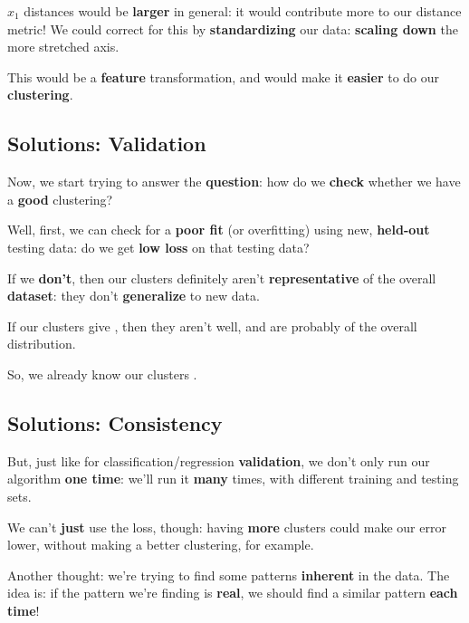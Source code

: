         $x_1$ distances would be \textbf{larger} in general: it would contribute more to our distance metric! We could correct for this by \textbf{standardizing} our data: \textbf{scaling down} the more stretched axis.
        
        This would be a \textbf{feature} transformation, and would make it \textbf{easier} to do our \textbf{clustering}.
    
    \subsection{Solutions: Validation}
    
        Now, we start trying to answer the \textbf{question}: how do we \textbf{check} whether we have a \textbf{good} clustering?
        
        Well, first, we can check for a \textbf{poor fit} (or overfitting) using new, \textbf{held-out} testing data: do we get \textbf{low loss} on that testing data?
        
        If we \textbf{don't}, then our clusters definitely aren't \textbf{representative} of the overall \textbf{dataset}: they don't \textbf{generalize} to new data.\\
        
        \begin{concept}
            If our clusters give  , then they aren't  well, and are probably  of the overall distribution.
            
            So, we already know our clusters .
        \end{concept}
        
            
    \subsection{Solutions: Consistency}
    
        But, just like for classification/regression \textbf{validation}, we don't only run our algorithm \textbf{one time}: we'll run it \textbf{many} times, with different training and testing sets.
        
        We can't \textbf{just} use the loss, though: having \textbf{more} clusters could make our error lower, without making a better clustering, for example.
        
        Another thought: we're trying to find some patterns \textbf{inherent} in the data. The idea is: if the pattern we're finding is \textbf{real}, we should find a similar pattern \textbf{each time}!
        
